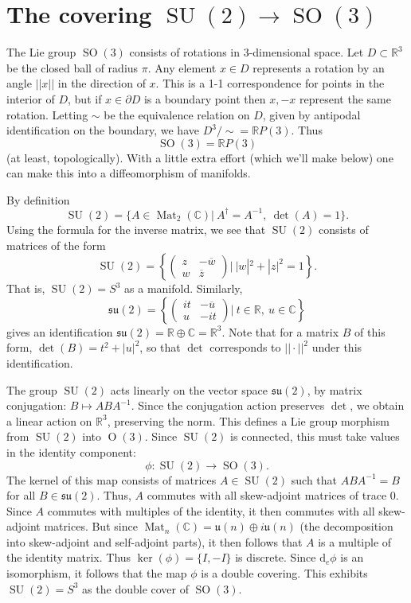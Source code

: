 \documentclass{article}
\theoremstyle{remark}
\newcommand{\R}{\mathbb{R}}
\newcommand{\C}{\mathbb{C}}
\newcommand{\on}{\operatorname}
\renewcommand{\ker}{ \on{ker}} \newcommand{\im}{ \on{im}}
\newcommand{\SU}{ \on{SU}}
\newcommand{\SO}{ \on{SO}}
\renewcommand{\d}{{\mbox{d}}}
\newcommand{\ol}{\overline}
\newcommand{\mf}{\mathfrak}
\begin{document}
\section{The covering $\SU(2)\to \SO(3)$}
%
The Lie group $\SO(3)$ consists of rotations in 3-dimensional space. 
Let $D\subset \R^3$ be the closed ball of radius $\pi$. Any 
element $x\in D$ represents a rotation by an angle $||x||$ in the direction 
of $x$. This is a 1-1 correspondence for points in the interior of $D$, but 
if $x\in \partial D$ is a boundary point then $x,-x$ represent the same rotation. Letting $\sim$ be the equivalence relation on $D$, given by antipodal identification on the boundary, we have $D^3/\sim =\R P(3)$. Thus 
%
\[ \SO(3)=\R P(3)\]
%
(at least, topologically). With a little extra effort (which we'll make below)
one can make this into a diffeomorphism of manifolds. 
 
By definition 
\[ \SU(2)=\{A\in \on{Mat}_2(\C)|\ A^\dagger=A^{-1},\ \det(A)=1\}.\]
%
Using the formula for the inverse matrix, we see that $\SU(2)$ consists of matrices of the form 
%
\[ \SU(2)=\left\{\left(\begin{array}{cc}
z&-\ol{w}\\ w& \ol{z}
\end{array}\right)|\ |w|^2+|z|^2=1\right\}.\]
%
That is, $\SU(2)=S^3$ as a manifold. Similarly, 
\[ \mf{su}(2)=\left\{\left(\begin{array}{cc}
it &-\ol{u}\\ u& -it
\end{array}\right)|\ t\in\R,\ u\in\C\right\}\]
%
gives an identification $\mf{su}(2)=\R\oplus \C=\R^3$. 
Note that for a matrix $B$ of this form, $\det(B)=t^2+|u|^2$, so that 
$\det$ corresponds to $||\cdot||^2$ under this identification. 

The group $\SU(2)$ acts linearly on the vector space $\mf{su}(2)$, 
by matrix conjugation: $B\mapsto ABA^{-1}$. 
Since  the conjugation action preserves $\det$, we obtain a linear 
action on $\R^3$, preserving the norm. This defines a Lie group morphism 
from $\SU(2)$ into $\on{O}(3)$. Since $\SU(2)$ is connected, this must take values in the identity component:
\[ \phi\colon \SU(2)\to \SO(3).\]
The kernel of this map consists of matrices $A\in\SU(2)$ such that $A
B A^{-1}=B$ for all $B\in\mf{su}(2)$. Thus, $A$ commutes with all skew-adjoint matrices of trace $0$. 
Since $A$ commutes with multiples of the identity, it then commutes with all skew-adjoint matrices. 
But since $\on{Mat}_n(\C)=\mf{u}(n)\oplus i\mf{u}(n)$ (the decomposition into skew-adjoint and self-adjoint parts), 
it then follows that $A$ is a multiple of the identity matrix. Thus $\ker(\phi)=\{I,-I\}$ is discrete. Since $\d_e\phi$ is
an isomorphism, it follows that the map $\phi$ is a double
covering. This exhibits $\SU(2)=S^3$ as the double cover of $\SO(3)$. 
\end{document}
